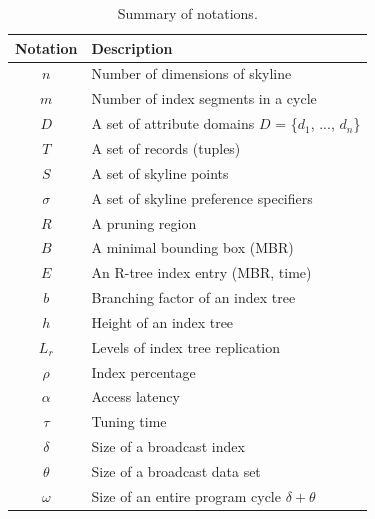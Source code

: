 \begin{table}[!t]
\centering \caption{Summary of notations.} \vspace*{5pt}
\label{tab:index_attr}
\begin{tabular}{|c|p{2.45in}|}
\hline
{\bf Notation} & {\bf Description}\\
\hline\hline
$n$ & Number of dimensions of skyline \\
$m$ & Number of index segments in a cycle \\
$D$ & A set of attribute domains $D$ = \{$d_1$, ..., $d_n$\} \\
$T$ & A set of records (tuples) \\
$S$ & A set of skyline points \\
$\sigma$ & A set of skyline preference specifiers \\
$R$ & A pruning region \\
$B$ & A minimal bounding box (MBR) \\
$E$ & An R-tree index entry (MBR, time) \\
$b$ & Branching factor of an index tree \\
$h$ & Height of an index tree \\
$L_r$ & Levels of index tree replication \\
$\rho$ & Index percentage \\
$\alpha$ & Access latency \\
$\tau$ & Tuning time \\
$\delta$ & Size of a broadcast index \\
$\theta$ & Size of a broadcast data set \\
$\omega$ & Size of an entire program cycle $\delta + \theta$ \\
\hline
\end{tabular}
\end{table}

